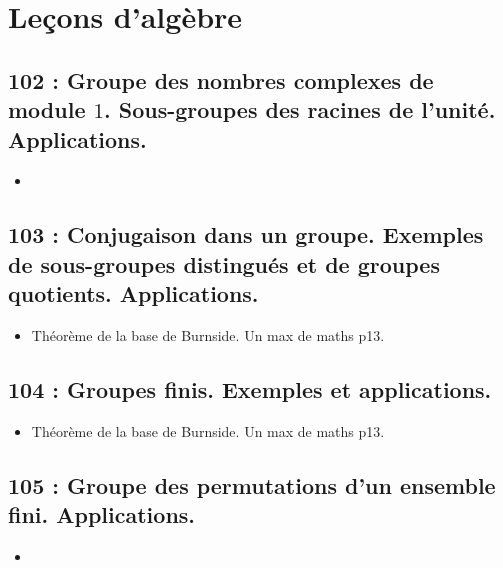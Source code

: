 \documentclass[a4paper,10pt,oneside,twocolumn,landscape]{book}
\begin{document}
	\onecolumn  %
	\begin{titlepage}
	\end{titlepage}
	
	\onecolumn  %

\tableofcontents  %

\thispagestyle{empty}



\chapter{Leçons d'algèbre}







\section{102 : Groupe des nombres complexes de module $1$. Sous-groupes des racines de l'unité. Applications.}
\begin{itemize}
	\item
\end{itemize}

\section{103 : Conjugaison dans un groupe. Exemples de sous-groupes distingués et de groupes quotients. Applications.}
\begin{itemize}
	\item Théorème de la base de Burnside. Un max de maths p13.
\end{itemize}


\section{104 : Groupes finis. Exemples et applications.}
\begin{itemize}
	\item Théorème de la base de Burnside. Un max de maths p13.
\end{itemize}


\section{105  : Groupe des permutations d’un ensemble fini. Applications.}
\begin{itemize}
	\item 
\end{itemize}
\end{document}
